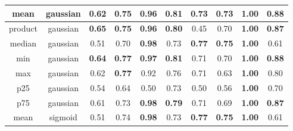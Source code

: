 \begin{table*}[!b]
\begin{tabular}{|c|c|c|c|c|c|c|c|c|c|}
        \hline
                   mean &        gaussian &                         0.62 &                \textbf{0.75} &             \textbf{0.96} &            \textbf{0.81} &                    0.73 &           \textbf{0.73} &          \textbf{1.00} &                \textbf{0.88} \\
        \hline
                product &        gaussian &                \textbf{0.65} &                \textbf{0.75} &             \textbf{0.96} &            \textbf{0.80} &                    0.45 &                    0.70 &          \textbf{1.00} &                \textbf{0.87} \\
        \hline
                 median &        gaussian &                         0.51 &                         0.70 &             \textbf{0.98} &                     0.73 &           \textbf{0.77} &           \textbf{0.75} &          \textbf{1.00} &                         0.61 \\
        \hline
                    min &        gaussian &                \textbf{0.64} &                \textbf{0.77} &             \textbf{0.97} &            \textbf{0.81} &                    0.71 &                    0.70 &          \textbf{1.00} &                \textbf{0.88} \\
        \hline
                    max &        gaussian &                         0.62 &                \textbf{0.77} &                      0.92 &                     0.76 &                    0.71 &                    0.63 &          \textbf{1.00} &                         0.80 \\
        \hline
                    p25 &        gaussian &                         0.54 &                         0.64 &                      0.50 &                     0.73 &                    0.50 &                    0.56 &          \textbf{1.00} &                         0.70 \\
        \hline
                    p75 &        gaussian &                         0.61 &                         0.73 &             \textbf{0.98} &            \textbf{0.79} &                    0.71 &                    0.69 &          \textbf{1.00} &                \textbf{0.87} \\
        \hline
                   mean &         sigmoid &                         0.51 &                         0.74 &             \textbf{0.98} &                     0.73 &           \textbf{0.77} &           \textbf{0.75} &          \textbf{1.00} &                         0.61 \\

\end{tabular}
\end{table*}
